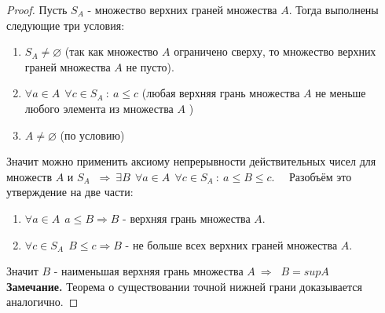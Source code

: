 \documentclass[12pt]{article}
\begin{document}
\begin{proof}
    Пусть $S_A$ - множество верхних граней множества $A$. Тогда выполнены следующие три условия: 
    \begin{enumerate}[itemsep=0mm, topsep=0mm, partopsep=0mm]
        \item $S_A \neq \varnothing$ (так как множество $A$ ограничено сверху, то множество верхних граней множества $A$ не пусто).
        \item $\forall a \in A \ \ \forall c \in S_A \ : \ a \leq c$ (любая верхняя грань множества $A$ не меньше любого элемента из множества $A$ )
        \item $A \neq \varnothing$ (по условию)
    \end{enumerate}
    Значит можно применить аксиому непрерывности действительных чисел для множеств $A$ и $S_A$ $ \ \Rightarrow \ \exists B \ \ \forall a \in A \ \ \forall c \in S_A \ : \ a \leq B \leq c$. \ \ Разобъём это утверждение на две части: 
    \begin{enumerate}[itemsep=0mm, topsep=0mm, partopsep=0mm]
        \item $\forall a \in A \ \ a \leq B \Rightarrow B$ - верхняя грань множества $A$.
        \item $\forall c \in S_A \ \ B \leq c \Rightarrow B$ - не больше всех верхних граней множества $A$.
    \end{enumerate} 
    Значит $B$ - наименьшая верхняя грань множества $A \ \Rightarrow \ $ $B = supA$ \\
    \textbf{Замечание.} Теорема о существовании точной нижней грани доказывается аналогично.
\end{proof}
\end{document}
